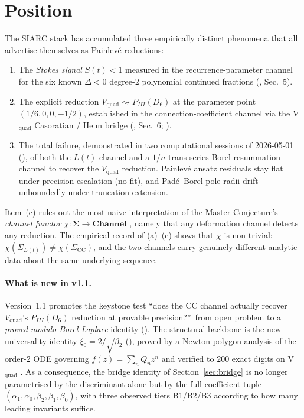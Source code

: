 \documentclass[11pt,reqno]{amsart}
\theoremstyle{plain}
\theoremstyle{definition}
\theoremstyle{remark}
\newcommand{\Channel}{\mathbf{Channel}}
\newcommand{\Sigmaspace}{\mathbf{\Sigma}}
\newcommand{\Lt}{L(t)}
\newcommand{\CC}{\mathrm{CC}}
\newcommand{\Vquad}{V_{\mathrm{quad}}}
\begin{document}
\tableofcontents

\section{Position}
\label{sec:position}

The SIARC stack has accumulated three empirically distinct
phenomena that all advertise themselves as Painlev\'e
reductions:
\begin{enumerate}[label=(\alph*)]
\item The \emph{Stokes signal} $S(t)<1$ measured in the
recurrence-parameter channel for the six known $\Delta<0$
degree-$2$ polynomial continued fractions
(\cite{siarc_pcf1_v13}, Sec.~5).
\item The explicit reduction
$\Vquad \rightsquigarrow P_{III}(D_6)$ at the parameter point
$(1/6, 0, 0, -1/2)$, established in the connection-coefficient
channel via the V$_\mathrm{quad}$ Casoratian / Heun bridge
(\cite{siarc_pcf1_v13}, Sec.~6;
\cite{slavyanov2000special, iwasaki1991from}).
\item The total failure, demonstrated in two computational
sessions of 2026-05-01 (\cite{siarc_painleve_deep_6x,
siarc_borel_5x, siarc_borel_kscan}), of both the $\Lt$ channel
and a $1/n$ trans-series Borel-resummation channel to recover
the $\Vquad$ reduction. Painlev\'e ansatz residuals stay flat
under precision escalation (no-fit), and Pad\'e--Borel pole
radii drift unboundedly under truncation extension.
\end{enumerate}
Item~(c) rules out the most naive interpretation of the
Master Conjecture's \emph{channel functor}
$\chi : \Sigmaspace \to \Channel$ \cite{siarc_umbrella},
namely that any deformation channel detects any reduction.
The empirical record of (a)--(c) shows that $\chi$ is
non-trivial: $\chi(\Sigma_{\Lt}) \ne \chi(\Sigma_{\CC})$,
and the two channels carry genuinely different analytic data
about the same underlying sequence.

\paragraph{What is new in v1.1.}
Version~1.1 promotes the keystone test
``does the $\CC$ channel actually recover $\Vquad$'s
$P_{III}(D_6)$ reduction at provable precision?''\
from open problem to a \emph{proved-modulo-Borel-Laplace}
identity (). The structural backbone is
the new universality identity
$\xi_0 = 2/\sqrt{\beta_2}$ (), proved by a
Newton-polygon analysis of the order-$2$ ODE governing
$f(z) = \sum_{n} Q_n z^n$ and verified to $200$ exact digits
on V$_{\text{quad}}$ \cite{siarc_cc_pipeline_g}. As a
consequence, the bridge identity of Section~\ref{sec:bridge}
is no longer parametrised by the discriminant alone but by
the full coefficient tuple
$(\alpha_1, \alpha_0, \beta_2, \beta_1, \beta_0)$, with three
observed tiers B1/B2/B3 according to how many leading
invariants suffice.
\end{document}
